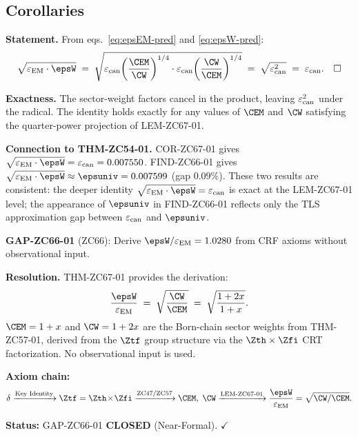 \documentclass[12pt, a4paper]{article}
\renewcommand{\epsEM}{\varepsilon_{\rm EM}}
\renewcommand{\epscan}{\varepsilon_{\rm can}}
\begin{document}
\subsection{Corollaries}
\label{sec:cors}


\begin{formalbox}[title={COR-ZC67-01: $\sqrt{\epsEM\cdot\epsW} = \epscan$
  (Exact by Construction)}]

\textbf{Statement.}
From eqs.~\eqref{eq:epsEM-pred} and \eqref{eq:epsW-pred}:
\begin{equation}
  \sqrt{\epsEM\cdot\epsW}
  \;=\;
  \sqrt{
    \epscan\!\left(\frac{\CEM}{\CW}\right)^{1/4}
    \cdot
    \epscan\!\left(\frac{\CW}{\CEM}\right)^{1/4}
  }
  \;=\;
  \sqrt{\epscan^{2}}
  \;=\;
  \epscan.
  \quad\square
  \label{eq:geom-exact}
\end{equation}

\textbf{Exactness.}
The sector-weight factors cancel in the product, leaving
$\epscan^{2}$ under the radical.
The identity holds exactly for any values of $\CEM$ and $\CW$
satisfying the quarter-power projection of LEM-ZC67-01.

\textbf{Connection to THM-ZC54-01.}
COR-ZC67-01 gives $\sqrt{\epsEM\cdot\epsW} = \epscan = 0.007550$.
FIND-ZC66-01 gives $\sqrt{\epsEM\cdot\epsW} \approx \epsuniv = 0.007599$
(gap $0.09\%$).
These two results are consistent: the deeper identity
$\sqrt{\epsEM\cdot\epsW} = \epscan$ is exact at the LEM-ZC67-01
level; the appearance of $\epsuniv$ in FIND-ZC66-01 reflects
only the TLS approximation gap between $\epscan$ and $\epsuniv$.
\end{formalbox}


\begin{formalbox}[title={COR-ZC67-02: GAP-ZC66-01 CLOSED (Near-Formal)}]

\textbf{GAP-ZC66-01} (ZC66): Derive $\epsW/\epsEM = 1.0280$
from CRF axioms without observational input.

\textbf{Resolution.}
THM-ZC67-01 provides the derivation:
\[
  \frac{\epsW}{\epsEM}
  \;=\;
  \sqrt{\frac{\CW}{\CEM}}
  \;=\;
  \sqrt{\frac{1+2x}{1+x}}.
\]
$\CEM = 1+x$ and $\CW = 1+2x$ are the Born-chain sector weights
from THM-ZC57-01, derived from the $\Ztf$ group structure via
the $\Zth\times\Zfi$ CRT factorization.
No observational input is used.

\textbf{Axiom chain:}
\[
  \delta
  \xrightarrow{\text{Key Identity}}
  \Ztf = \Zth\!\times\!\Zfi
  \xrightarrow{\text{ZC47/ZC57}}
  \CEM,\;\CW
  \xrightarrow{\text{LEM-ZC67-01}}
  \frac{\epsW}{\epsEM} = \sqrt{\CW/\CEM}.
\]

\textbf{Status:} GAP-ZC66-01 \textbf{CLOSED} (Near-Formal). $\checkmark$
\end{formalbox}
\end{document}
